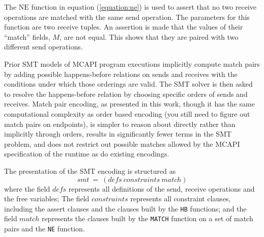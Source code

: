 
The $\mathrm{NE}$ function in equation (\ref{equation:ne}) is used to assert that no two receive operations are matched
with the same send operation. The parameters for this function are two receive
tuples. An assertion is made that the values of their ``match'' fields, $M$,
are not equal. This shows that they are paired with two different send
operations.

Prior SMT models of MCAPI program executions implicitly compute
match pairs by adding possible happens-before relations on sends and
receives with the conditions under which those orderings are
valid. The SMT solver is then asked to resolve the happens-before
relation by choosing specific orders of sends and receives. Match pair
encoding, as presented in this work, though it has the same
computational complexity as order based encoding (you still need to
figure out match pairs on endpoints), is simpler to reason about
directly rather than implicitly through orders, results in
significantly fewer terms in the SMT problem, and does not restrict out possible matches allowed by the MCAPI specification of the runtime as do existing encodings.

The presentation of the SMT encoding is structured as
\[\mathit{smt}\ =\ (\mathit{defs}\ \mathit{constraints}\ \mathit{match})\]
where the field $\mathit{defs}$ represents all definitions of the send, receive operations and the free variables; The field $\mathit{constraints}$ represents all constraint clauses, including the assert clauses and the clauses built by the \texttt{HB} functions; and the field $\mathit{match}$ represents the clauses built by the \texttt{MATCH} function on a set of match pairs and the \texttt{NE} function. %

